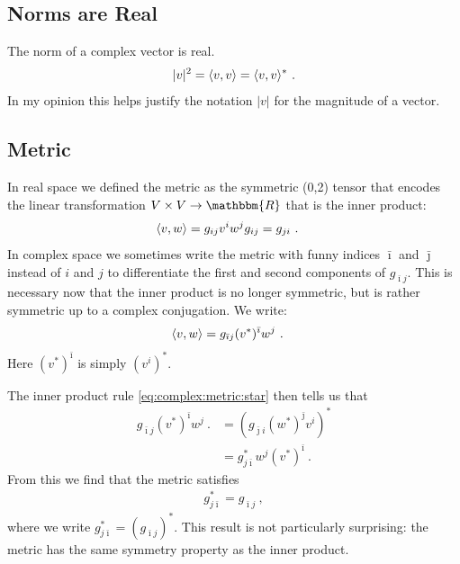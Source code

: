 \documentclass[12pt, oneside]{report}    %
\begin{document}
\subsection{Norms are Real}
The norm of a complex vector is real. 
\begin{align}
    |v|^2 = \langle v, v \rangle = \langle v, v \rangle^* \ .
\end{align}
In my opinion this helps justify the notation $|v|$ for the magnitude of a vector.


\subsection{Metric}
In real space we defined the metric as the symmetric (0,2) tensor that encodes the linear transformation $V\times V \to \mathbbm{R}$ that is the inner product:
\begin{align}
    \langle v , w \rangle = g_{ij}v^i w^j 
    &
    g_{ij} = g_{ji}
    \ .
\end{align}
In complex space we sometimes write the metric with funny indices $\bar{\imath}$ and $\bar{\jmath}$ instead of $i$ and $j$ to differentiate the first and second components of $g_{\bar{\imath}j}$. This is necessary now that the inner product is no longer symmetric, but is rather symmetric up to a complex conjugation. We write:
\begin{align}
    \langle v, w \rangle &= g_{\bar{\imath}j}(v^*)^{\bar{\imath}}w^j \ .
\end{align}
Here $(v^*)^{\bar{\imath}}$ is simply $(v^i)^*$.

The inner product rule \eqref{eq:complex:metric:star} then tells us that
\begin{align}
    g_{\bar{\imath}j}(v^*)^{\bar{\imath}}w^j \ .
    &= 
    \left(
        g_{\bar{\jmath}i}
        (w^*)^{\bar{\jmath}}
        v^i
        \right)^*
    \\
    &= 
    g_{j\bar{\imath}}^* w^j(v^*)^{\bar{\imath}}
     \ .
\end{align}
From this we find that the metric satisfies
\begin{align}
g_{j\bar{\imath}}^* =
    g_{\bar{\imath}j} \ ,
\end{align}
where we write $g_{j\bar{\imath}}^* = (g_{\bar\imath j})^*$.  This result is not particularly surprising: the metric has the same symmetry property as the inner product. 
\end{document}
